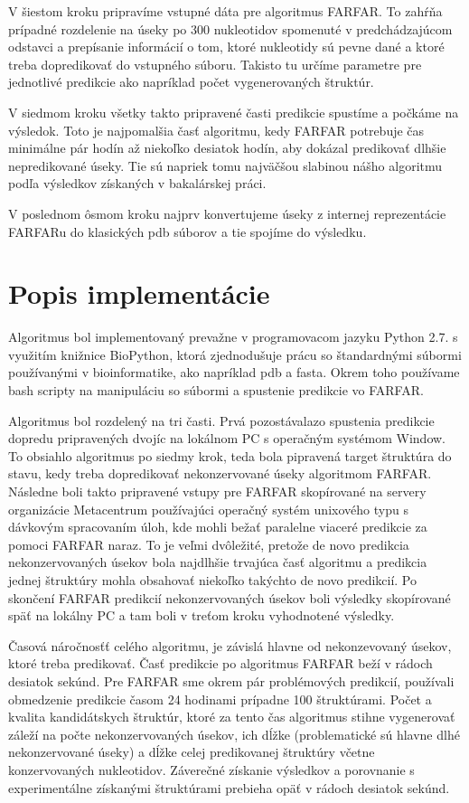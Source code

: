\indent V šiestom kroku pripravíme vstupné dáta pre algoritmus FARFAR. To zahŕňa prípadné rozdelenie na úseky po 300 nukleotidov spomenuté v predchádzajúcom odstavci a prepísanie informácií o tom, ktoré nukleotidy sú pevne dané a ktoré treba dopredikovať do vstupného súboru. Takisto tu určíme parametre pre jednotlivé predikcie ako napríklad počet vygenerovaných štruktúr.  


\indent
V siedmom kroku všetky takto pripravené časti predikcie spustíme a počkáme na výsledok. Toto je najpomalšia časť algoritmu, kedy FARFAR potrebuje čas minimálne pár hodín až niekoľko desiatok hodín, aby dokázal predikovať dlhšie nepredikované úseky. Tie sú napriek tomu najväčšou slabinou nášho algoritmu podľa výsledkov získaných v bakalárskej práci.


\indent V poslednom ôsmom kroku najprv konvertujeme úseky z internej reprezentácie FARFARu do klasických pdb súborov a tie spojíme do výsledku.  


\section{Popis implementácie}
Algoritmus bol implementovaný prevažne v programovacom jazyku Python 2.7. s využitím knižnice BioPython, ktorá zjednodušuje prácu so štandardnými súbormi používanými v bioinformatike, ako napríklad pdb a fasta. Okrem toho používame bash scripty na manipuláciu so súbormi a spustenie predikcie vo FARFAR.


\indent Algoritmus bol rozdelený na tri časti. Prvá pozostávalazo spustenia predikcie dopredu pripravených dvojíc na lokálnom PC s operačným systémom Window. To obsiahlo algoritmus  po siedmy krok, teda bola pipravená target štruktúra do stavu, kedy treba dopredikovať nekonzervované úseky algoritmom FARFAR. Následne boli takto pripravené vstupy pre FARFAR skopírované na servery organizácie Metacentrum používajúci operačný systém unixového typu s dávkovým spracovaním úloh, kde mohli bežať paralelne viaceré predikcie za pomoci FARFAR naraz. To je veľmi dvôležité, pretože de novo predikcia nekonzervovaných úsekov bola najdlhšie trvajúca časť algoritmu a  predikcia jednej štruktúry mohla obsahovať niekoľko takýchto de novo predikcií. Po skončení FARFAR predikcií nekonzervovaných úsekov boli výsledky skopírované späť na lokálny PC a tam boli v treťom kroku vyhodnotené výsledky. 


\indent Časová náročnosťť celého algoritmu, je závislá hlavne od nekonzevovaný úsekov, ktoré treba predikovať. Časť predikcie po algoritmus FARFAR beží v rádoch desiatok sekúnd. Pre FARFAR sme okrem pár problémových predikcií, používali obmedzenie predikcie časom 24 hodinami prípadne 100 štruktúrami. Počet a kvalita kandidátskych štruktúr, ktoré za tento čas algoritmus stihne vygenerovať záleží na počte nekonzervovaných úsekov, ich dĺžke (problematické sú hlavne dlhé nekonzervované úseky) a dĺžke celej predikovanej štruktúry včetne konzervovaných nukleotidov. Záverečné získanie výsledkov a porovnanie s experimentálne získanými štruktúrami prebieha opäť v rádoch desiatok sekúnd.


